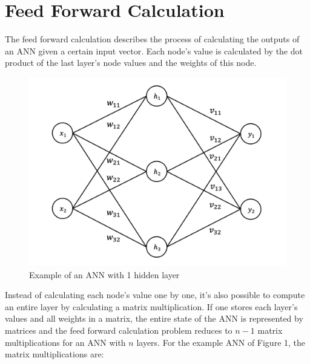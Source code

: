 \documentclass[sigconf]{acmart}
\begin{document}
\section{Feed Forward Calculation}{
The feed forward calculation describes the process of calculating
the outputs of an ANN given a certain input vector.
Each node's value is calculated by the dot product of the last layer's node values and the weights of this node.



\begin{figure}[H]
    \includegraphics[width=\columnwidth]{imgs/ann_example.png}
    \caption{Example of an ANN with 1 hidden layer}
\end{figure}
Instead of calculating each node's value one by one, it's also possible to compute an entire layer
by calculating a matrix multiplication.
If one stores each layer's values and all weights in a matrix, the entire state of the ANN is represented by matrices
and the feed forward calculation problem reduces to $n-1$ matrix multiplications for an ANN with $n$ layers.
For the example ANN of Figure 1, the matrix multiplications are:
}
\end{document}
